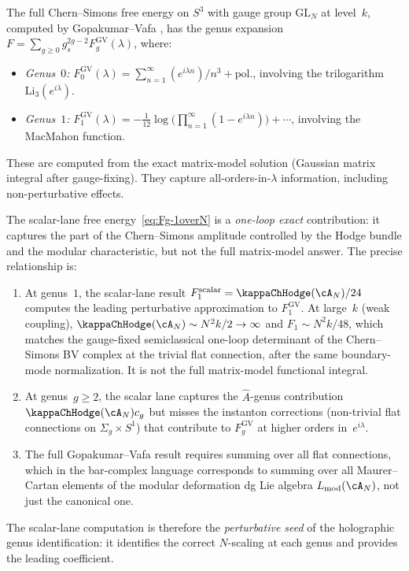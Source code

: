 \begin{remark}
\label{rem:gopakumar-vafa-comparison}
The full Chern--Simons free energy on $S^3$ with gauge group
$\mathrm{GL}_N$ at level~$k$, computed by Gopakumar--Vafa
\cite{GV99}, has the genus expansion
$F = \sum_{g \ge 0} g_s^{2g-2} F_g^{\mathrm{GV}}(\lambda)$,
where:
\begin{itemize}
\item \emph{Genus~$0$:} $F_0^{\mathrm{GV}}(\lambda) = \sum_{n=1}^\infty
 (e^{i\lambda n})/n^3 + \mathrm{pol.}$, involving the trilogarithm
 $\mathrm{Li}_3(e^{i\lambda})$.
\item \emph{Genus~$1$:} $F_1^{\mathrm{GV}}(\lambda) = -\frac{1}{12}\log
 \bigl(\prod_{n=1}^\infty (1 - e^{i\lambda n})\bigr) + \cdots$,
 involving the MacMahon function.
\end{itemize}
These are computed from the exact matrix-model solution (Gaussian
matrix integral after gauge-fixing). They capture all-orders-in-$\lambda$
information, including non-perturbative effects.

The scalar-lane free energy~\eqref{eq:Fg-1overN} is a
\emph{one-loop exact} contribution: it captures the part of the
Chern--Simons amplitude controlled by the Hodge bundle and the modular
characteristic, but not the full matrix-model answer. The precise
relationship is:
\begin{enumerate}[label=\textup{(\alph*)}]
\item At genus~$1$, the scalar-lane result $F_1^{\mathrm{scalar}}
 = \kappaChHodge(\cA_N)/24$
 computes the leading perturbative
approximation to $F_1^{\mathrm{GV}}$. At large~$k$ (weak coupling),
$\kappaChHodge(\cA_N) \sim N^2 k/2 \to \infty$ and
$F_1 \sim N^2 k/48$, which
 matches the gauge-fixed semiclassical one-loop determinant of the
 Chern--Simons BV complex at the trivial flat connection, after the
 same boundary-mode normalization.  It is not the full matrix-model
 functional integral.
\item At genus~$g \geq 2$, the scalar lane captures the
 $\hat{A}$-genus contribution $\kappaChHodge(\cA_N)c_g$ but misses
 the instanton corrections (non-trivial flat connections on
 $\Sigma_g \times S^1$) that contribute to $F_g^{\mathrm{GV}}$ at
 higher orders in~$e^{i\lambda}$.
\item The full Gopakumar--Vafa result requires summing over all flat
 connections, which in the bar-complex language corresponds to summing
 over all Maurer--Cartan elements of the modular deformation dg
 Lie algebra $L_{\mathrm{mod}}(\cA_N)$, not just the canonical one.
\end{enumerate}
The scalar-lane computation is therefore the \emph{perturbative seed}
of the holographic genus identification: it identifies the
correct $N$-scaling at each genus and provides the leading
coefficient.
\end{remark}

